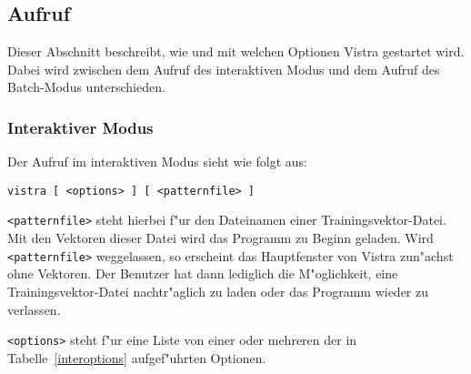 \subsection{Aufruf}
\label{call}

Dieser Abschnitt beschreibt, wie und mit welchen Optionen Vistra
gestartet wird.
Dabei wird zwischen dem Aufruf des interaktiven Modus und
dem Aufruf des Batch-Modus unterschieden.

\subsubsection*{Interaktiver Modus}

Der Aufruf im interaktiven Modus sieht wie folgt aus:

{\tt vistra [ <options> ]  [ <patternfile> ]}

{\tt <patternfile>} steht hierbei f"ur den Dateinamen einer
Trainingsvektor-Datei.
Mit den Vektoren dieser Datei wird das Programm zu Beginn geladen.
Wird {\tt <patternfile>} weggelassen, so erscheint das Hauptfenster 
von Vistra zun"achst ohne Vektoren. 
Der Benutzer hat dann lediglich die M"oglichkeit, eine
Trainingsvektor-Datei nachtr"aglich zu laden oder das Programm wieder
zu verlassen.
  
{\tt <options>} steht f"ur eine Liste von einer oder mehreren der
in Tabelle~\ref{interoptions} aufgef"uhrten Optionen. 

